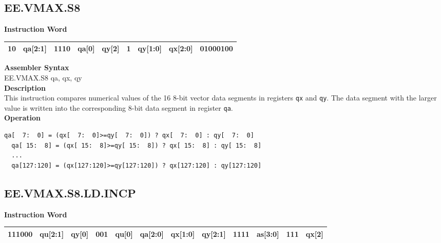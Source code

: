 \clearpage
\subsection{EE.VMAX.S8}\label{instruction:EEVMAXS8}
\setlength\tabcolsep{6pt}
\textbf{Instruction Word} \\
\begin{tabular}{|c|c|c|c|c|c|c|c|c|}
	\hline
	10 & qa[2:1] & 1110 & qa[0] & qy[2] & 1 & qy[1:0] & qx[2:0] & 01000100 \\
	\hline
\end{tabular}

\textbf{Assembler Syntax} \\
EE.VMAX.S8 qa, qx, qy \\
\textbf{Description} \\
This instruction compares numerical values of the 16 8-bit vector data segments in registers \lstinline{qx} and \lstinline{qy}. The data segment with the larger value is written into the corresponding 8-bit data segment in register \lstinline{qa}.\\
\textbf{Operation}
\begin{lstlisting}[escapeinside=`?]
  qa[  7:  0] = (qx[  7:  0]>=qy[  7:  0]) ? qx[  7:  0] : qy[  7:  0]
  qa[ 15:  8] = (qx[ 15:  8]>=qy[ 15:  8]) ? qx[ 15:  8] : qy[ 15:  8]
  ...
  qa[127:120] = (qx[127:120]>=qy[127:120]) ? qx[127:120] : qy[127:120]
\end{lstlisting}

\clearpage
\subsection{EE.VMAX.S8.LD.INCP}\label{instruction:EEVMAXS8LDINCP}
\setlength\tabcolsep{6pt}
\textbf{Instruction Word} \\
\begin{tabular}{|c|c|c|c|c|c|c|c|c|c|c|c|}
	\hline
	111000 & qu[2:1] & qy[0] & 001 & qu[0] & qa[2:0] & qx[1:0] & qy[2:1] & 1111 & as[3:0] & 111 & qx[2] \\
	\hline
\end{tabular}

